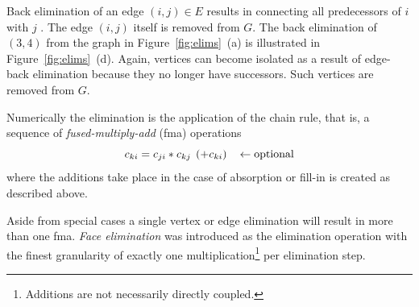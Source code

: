 \documentclass[acmtocl,acmnow]{acmtrans2m}
\newcommand{\reffig}[1]{Figure~\ref{#1}}
\begin{document}
Back elimination of an edge
$(i,j) \in E$ results in connecting all predecessors of $i$
with $j$ \cite{ElimTechAD2000}.
The edge $(i,j)$ itself is removed from $G.$
The back elimination of $(3,4)$ from the graph in \reffig{fig:elims}~(a) 
is illustrated in \reffig{fig:elims}~(d). 
Again, vertices can become isolated as a result of edge-back elimination
because they no longer have successors.
Such vertices are removed from $G.$

Numerically the elimination is the application of 
the chain rule, that is, a sequence of {\em fused-multiply-add} (fma) operations
\begin{equation}\label{eqn:fma}
c_{ki}=c_{ji}*c_{kj}\hspace*{1ex}(+c_{ki}) \hspace*{2ex}\gets \mbox{optional}
\end{equation}
where the additions take place in the case of absorption or fill-in is created 
as described above.

Aside from special cases a single vertex or edge elimination will result in more
than one fma. {\em Face elimination} was introduced 
as the elimination operation with the finest granularity of exactly 
one multiplication\footnote{Additions are not necessarily directly coupled.} 
per elimination step.
\end{document}
